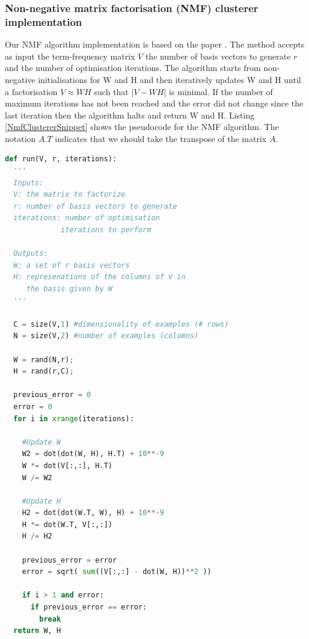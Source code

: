 \subsubsection{Non-negative matrix factorisation (NMF) clusterer implementation} Our NMF algorithm implementation is based on the paper \citep{lee99}. The method accepts as input the term-frequency matrix $V$ the number of basis vectors to generate $r$ and the number of optimisation iterations. The algorithm starts from non-negative initialisations for W and H and then iteratively updates W and H until a factorisation $V \approx WH$ such that $| V - WH |$ is minimal. If the number of maximum iterations has not been reached and the error did not change since the last iteration then the algorithm halts and return W and H. Listing \ref{NmfClustererSnippet} shows the pseudocode for the NMF algorithm. The notation $A.T$ indicates that we should take the transpose of the matrix $A$.
  
\begin{lstlisting}[language=Python, label=NmfClustererSnippet, caption=Pseudocode for the NMF algorithm]
def run(V, r, iterations):
  '''
  Inputs: 
  V: the matrix to factorize
  r: number of basis vectors to generate
  iterations: number of optimisation
             iterations to perform
  
  Outputs:
  W: a set of r basis vectors
  H: represenations of the columns of V in 
     the basis given by W
  '''
  
  C = size(V,1) #dimensionality of examples (# rows)
  N = size(V,2) #number of examples (columns)

  W = rand(N,r);
  H = rand(r,C);
  
  previous_error = 0
  error = 0
  for i in xrange(iterations):

    #Update W
    W2 = dot(dot(W, H), H.T) + 10**-9
    W *= dot(V[:,:], H.T)
    W /= W2
    
    #Update H
    H2 = dot(dot(W.T, W), H) + 10**-9
    H *= dot(W.T, V[:,:])
    H /= H2                                     
    
    previous_error = error
    error = sqrt( sum((V[:,:] - dot(W, H))**2 ))
    
    if i > 1 and error:
      if previous_error == error:
        break
  return W, H
  
\end{lstlisting}

